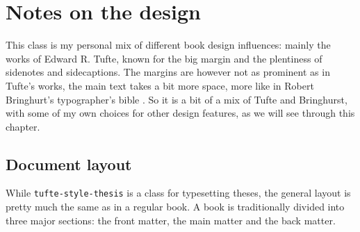 
\chapter{Notes on the design}

This class is my personal mix of different book design influences: mainly the works of Edward R. Tufte,
 known for the big margin and the plentiness of
sidenotes and sidecaptions.
The margins are however not as prominent as in Tufte's works, the main text takes a bit more space,
more like in Robert Bringhurt's typographer's bible \parencite{BringhurstEoTS}.
So it is a bit of a mix of Tufte and Bringhurst,
with some of my own choices for other design features, as we will see through this chapter.

\section{Document layout}

While \texttt{tufte-style-thesis} is a class for typesetting theses,
the general layout is pretty much the same as in a regular book.
A book is traditionally divided into three major sections:
the front matter, the main matter and the back matter.


